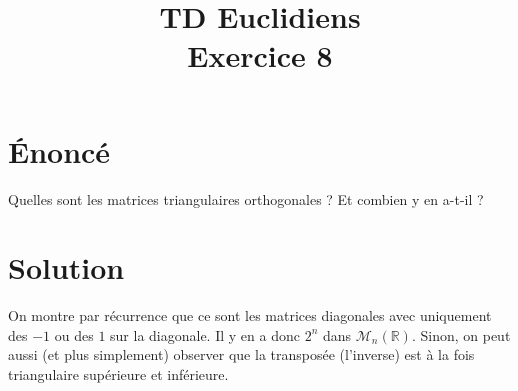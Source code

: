 \documentclass[french]{article}
\title{TD Euclidiens\\ Exercice 8}
\date{}
\newcommand{\R}{\mathbb{R}}
\begin{document}
\maketitle

\section{Énoncé}
Quelles sont les matrices triangulaires orthogonales ? Et combien y en a-t-il ?
\section{Solution}
On montre par récurrence que ce sont les matrices diagonales avec uniquement des $-1$ ou des $1$ sur la diagonale. Il y en a donc $2^n$ dans $\mathcal{M}_n(\R)$. Sinon, on peut aussi (et plus simplement) observer que la transposée (l'inverse) est à la fois triangulaire supérieure et inférieure.
\end{document}
